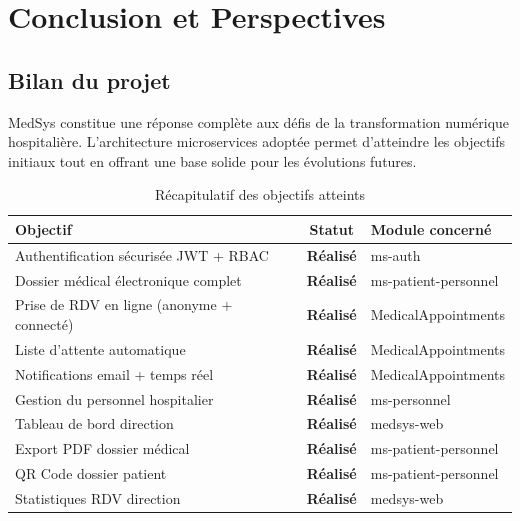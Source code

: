 \chapter{Conclusion et Perspectives}

\section{Bilan du projet}

MedSys constitue une réponse complète aux défis de la transformation numérique
hospitalière. L'architecture microservices adoptée permet d'atteindre les objectifs
initiaux tout en offrant une base solide pour les évolutions futures.

\begin{table}[H]
\centering
\renewcommand{\arraystretch}{1.4}
\begin{tabular}{|l|c|l|}
\hline
\rowcolor{tabhead}\color{white}\textbf{Objectif} &
\color{white}\textbf{Statut} &
\color{white}\textbf{Module concerné} \\
\hline
Authentification sécurisée JWT + RBAC & \textcolor{medsysgreen}{\bfseries Réalisé} & ms-auth \\
\rowcolor{roweven}
Dossier médical électronique complet & \textcolor{medsysgreen}{\bfseries Réalisé} & ms-patient-personnel \\
Prise de RDV en ligne (anonyme + connecté) & \textcolor{medsysgreen}{\bfseries Réalisé} & MedicalAppointments \\
\rowcolor{roweven}
Liste d'attente automatique & \textcolor{medsysgreen}{\bfseries Réalisé} & MedicalAppointments \\
Notifications email + temps réel & \textcolor{medsysgreen}{\bfseries Réalisé} & MedicalAppointments \\
\rowcolor{roweven}
Gestion du personnel hospitalier & \textcolor{medsysgreen}{\bfseries Réalisé} & ms-personnel \\
Tableau de bord direction & \textcolor{medsysgreen}{\bfseries Réalisé} & medsys-web \\
\rowcolor{roweven}
Export PDF dossier médical & \textcolor{medsysgreen}{\bfseries Réalisé} & ms-patient-personnel \\
QR Code dossier patient & \textcolor{medsysgreen}{\bfseries Réalisé} & ms-patient-personnel \\
\rowcolor{roweven}
Statistiques RDV direction & \textcolor{medsysgreen}{\bfseries Réalisé} & medsys-web \\
\hline
\end{tabular}
\caption{Récapitulatif des objectifs atteints}
\end{table}

